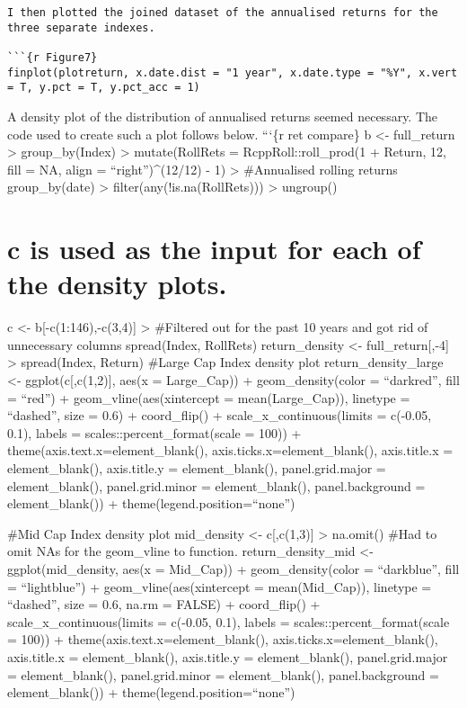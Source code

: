 \documentclass[
]{article}
\begin{document}
\begin{verbatim}
I then plotted the joined dataset of the annualised returns for the three separate indexes. 

```{r Figure7}
finplot(plotreturn, x.date.dist = "1 year", x.date.type = "%Y", x.vert = T, y.pct = T, y.pct_acc = 1)
\end{verbatim}

A density plot of the distribution of annualised returns seemed
necessary. The code used to create such a plot follows below. ```\{r ret
compare\} b \textless- full\_return \textbar\textgreater{}
group\_by(Index) \textbar\textgreater{} mutate(RollRets =
RcppRoll::roll\_prod(1 + Return, 12, fill = NA, align =
``right'')\^{}(12/12) - 1) \textbar\textgreater{} \#Annualised rolling
returns group\_by(date) \textbar\textgreater{}
filter(any(!is.na(RollRets))) \textbar\textgreater{} ungroup()

\hypertarget{c-is-used-as-the-input-for-each-of-the-density-plots.}{%
\section{c is used as the input for each of the density
plots.}\label{c-is-used-as-the-input-for-each-of-the-density-plots.}}

c \textless- b{[}-c(1:146),-c(3,4){]} \textbar\textgreater{} \#Filtered
out for the past 10 years and got rid of unnecessary columns
spread(Index, RollRets) return\_density \textless- full\_return{[},-4{]}
\textbar\textgreater{} spread(Index, Return) \#Large Cap Index density
plot return\_density\_large \textless- ggplot(c{[},c(1,2){]}, aes(x =
Large\_Cap)) + geom\_density(color = ``darkred'', fill = ``red'') +
geom\_vline(aes(xintercept = mean(Large\_Cap)), linetype = ``dashed'',
size = 0.6) + coord\_flip() + scale\_x\_continuous(limits = c(-0.05,
0.1), labels = scales::percent\_format(scale = 100)) +
theme(axis.text.x=element\_blank(), axis.ticks.x=element\_blank(),
axis.title.x = element\_blank(), axis.title.y = element\_blank(),
panel.grid.major = element\_blank(), panel.grid.minor =
element\_blank(), panel.background = element\_blank()) +
theme(legend.position=``none'')

\#Mid Cap Index density plot mid\_density \textless- c{[},c(1,3){]}
\textbar\textgreater{} na.omit() \#Had to omit NAs for the geom\_vline
to function. return\_density\_mid \textless- ggplot(mid\_density, aes(x
= Mid\_Cap)) + geom\_density(color = ``darkblue'', fill = ``lightblue'')
+ geom\_vline(aes(xintercept = mean(Mid\_Cap)), linetype = ``dashed'',
size = 0.6, na.rm = FALSE) + coord\_flip() + scale\_x\_continuous(limits
= c(-0.05, 0.1), labels = scales::percent\_format(scale = 100)) +
theme(axis.text.x=element\_blank(), axis.ticks.x=element\_blank(),
axis.title.x = element\_blank(), axis.title.y = element\_blank(),
panel.grid.major = element\_blank(), panel.grid.minor =
element\_blank(), panel.background = element\_blank()) +
theme(legend.position=``none'')
\end{document}
